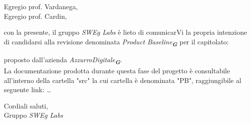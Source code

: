
\fancyfoot[C]{\thepage} %



Egregio prof. Vardanega, \\
Egregio prof. Cardin, \\
\vspace{0.5cm}

con la presente, il gruppo \emph{SWEg Labs} è lieto di comunicarVi la propria intenzione di candidarsi alla revisione denominata
\emph{Product Baseline}\textsubscript{\textit{\textbf{G}}} per il capitolato:\\
\begin{center}
\end{center}
proposto dall’azienda \emph{AzzurroDigitale}\textsubscript{\textit{\textbf{G}}}.\\
La documentazione prodotta durante questa fase del progetto è consultabile all’interno della cartella "src"
la cui cartella è denominata "PB", raggiungibile al seguente link: 
\dots

Cordiali saluti,\\
Gruppo \emph{SWEg Labs}

